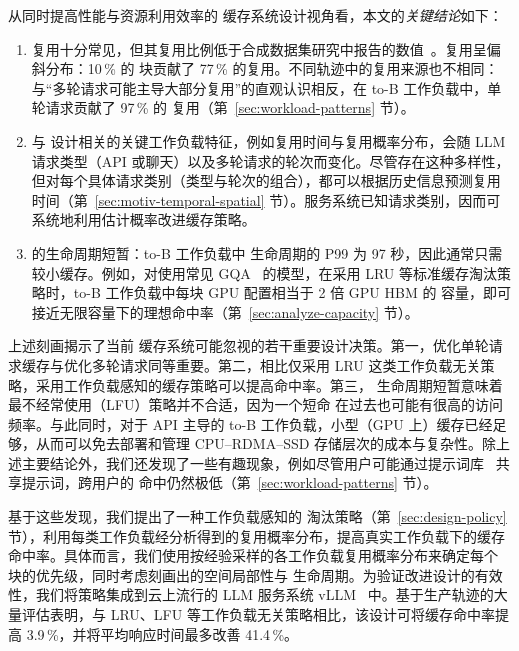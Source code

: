 从同时提高性能与资源利用效率的 {\kvcache} 缓存系统设计视角看，本文的\emph{关键结论}如下：
\begin{enumerate}[leftmargin=*,itemsep=2pt]
    \item {\kvcache} 复用十分常见，但其复用比例低于合成数据集研究中报告的数值~\cite{cachedattention,DBLP:journals/corr/abs-2403-14401}。复用呈偏斜分布：10\,\% 的 {\kvcache} 块贡献了 77\,\% 的复用。不同轨迹中的复用来源也不相同：与“多轮请求可能主导大部分复用”的直观认识相反，在 to-B 工作负载中，单轮请求贡献了 97\,\% 的 {\kvcache} 复用（第~\ref{sec:workload-patterns} 节）。
    \item 与 {\kvcache} 设计相关的关键工作负载特征，例如复用时间与复用概率分布，会随 LLM 请求类型（API 或聊天）以及多轮请求的轮次而变化。尽管存在这种多样性，但对每个具体请求类别（类型与轮次的组合），都可以根据历史信息预测复用时间（第~\ref{sec:motiv-temporal-spatial} 节）。服务系统已知请求类别，因而可系统地利用估计概率改进缓存策略。
    \item {\kvcache} 的生命周期短暂：to-B 工作负载中 {\kvcache} 生命周期的 P99 为 97 秒，因此通常只需较小缓存。例如，对使用常见 GQA~\cite{DBLP:conf/emnlp/AinslieLJZLS23} 的模型，在采用 LRU 等标准缓存淘汰策略时，to-B 工作负载中每块 GPU 配置相当于 2 倍 GPU HBM 的 {\kvcache} 容量，即可接近无限容量下的理想命中率（第~\ref{sec:analyze-capacity} 节）。
\end{enumerate}

上述刻画揭示了当前 {\kvcache} 缓存系统可能忽视的若干重要设计决策。第一，优化单轮请求缓存与优化多轮请求同等重要。第二，相比仅采用 LRU 这类工作负载无关策略，采用工作负载感知的缓存策略可以提高命中率。第三，{\kvcache} 生命周期短暂意味着最不经常使用（LFU）策略并不合适，因为一个短命 {\kvcache} 在过去也可能有很高的访问频率。与此同时，对于 API 主导的 to-B 工作负载，小型（GPU 上）缓存已经足够，从而可以免去部署和管理 CPU--RDMA--SSD {\kvcache} 存储层次的成本与复杂性。除上述主要结论外，我们还发现了一些有趣现象，例如尽管用户可能通过提示词库~\cite{prompt-library} 共享提示词，跨用户的 {\kvcache} 命中仍然极低（第~\ref{sec:workload-patterns} 节）。

基于这些发现，我们提出了一种工作负载感知的 {\kvcache} 淘汰策略（第~\ref{sec:design-policy} 节），利用每类工作负载经分析得到的复用概率分布，提高真实工作负载下的缓存命中率。具体而言，我们使用按经验采样的各工作负载复用概率分布来确定每个 {\kvcache} 块的优先级，同时考虑刻画出的空间局部性与 {\kvcache} 生命周期。为验证改进设计的有效性，我们将策略集成到云上流行的 LLM 服务系统 vLLM~\cite{vllm} 中。基于生产轨迹的大量评估表明，与 LRU、LFU 等工作负载无关策略相比，该设计可将缓存命中率提高 3.9\,\%，并将平均响应时间最多改善 41.4\,\%。

